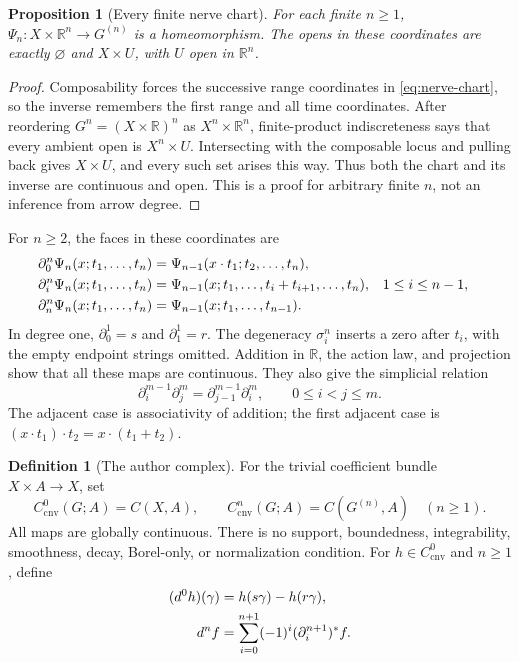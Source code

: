 \documentclass[11pt]{article}
\newtheorem{proposition}[theorem]{Proposition}
\theoremstyle{definition}
\newtheorem{definition}[theorem]{Definition}
\newcommand{\R}{\mathbb R}
\newcommand{\Ccnv}{C_{\mathrm{cnv}}}
\begin{document}
\begin{proposition}[Every finite nerve chart]
\label{prop:nerve}
For each finite $n\geq1$, $\Psi_n:X\times\R^n\to G^{(n)}$ is a
homeomorphism.  The opens in these coordinates are exactly $\varnothing$
and $X\times U$, with $U$ open in $\R^n$.
\end{proposition}

\begin{proof}
Composability forces the successive range coordinates in
\cref{eq:nerve-chart}, so the inverse remembers the first range and all time
coordinates.  After reordering $G^n=(X\times\R)^n$ as
$X^n\times\R^n$, finite-product indiscreteness says that every ambient open
is $X^n\times U$.  Intersecting with the composable locus and pulling back
gives $X\times U$, and every such set arises this way.  Thus both the chart
and its inverse are continuous and open.  This is a proof for arbitrary
finite $n$, not an inference from arrow degree.
\end{proof}

For $n\geq2$, the faces in these coordinates are
\begin{align}
\label{eq:faces}
 \partial_0^n\Psi_n(x;t_1,\ldots,t_n)
  &=\Psi_{n-1}(x\mathbin{\cdot}t_1;t_2,\ldots,t_n),\notag\\
 \partial_i^n\Psi_n(x;t_1,\ldots,t_n)
  &=\Psi_{n-1}(x;t_1,\ldots,t_i+t_{i+1},\ldots,t_n),
       &&1\leq i\leq n-1,\\
 \partial_n^n\Psi_n(x;t_1,\ldots,t_n)
  &=\Psi_{n-1}(x;t_1,\ldots,t_{n-1}).\notag
\end{align}
In degree one, $\partial_0^1=s$ and $\partial_1^1=r$.  The degeneracy
$\sigma_i^n$ inserts a zero after $t_i$, with the empty endpoint strings
omitted.  Addition in $\R$, the action law, and projection show that all
these maps are continuous.  They also give the simplicial relation
\begin{equation}
\label{eq:face-identity}
 \partial_i^{m-1}\partial_j^m
 =\partial_{j-1}^{m-1}\partial_i^m,\qquad 0\leq i<j\leq m.
\end{equation}
The adjacent case is associativity of addition; the first adjacent case is
$(x\mathbin{\cdot}t_1)\mathbin{\cdot}t_2
=x\mathbin{\cdot}(t_1+t_2)$.

\begin{definition}[The author complex]
\label{def:complex}
For the trivial coefficient bundle $X\times A\to X$, set
\begin{equation}
\label{eq:cochains}
 \Ccnv^0(G;A)=C(X,A),\qquad
 \Ccnv^n(G;A)=C(G^{(n)},A)\quad(n\geq1).
\end{equation}
All maps are globally continuous.  There is no support, boundedness,
integrability, smoothness, decay, Borel-only, or normalization condition.
For $h\in\Ccnv^0$ and $n\geq1$, define
\begin{align}
\label{eq:differential}
 (d^0h)(\gamma)&=h(s\gamma)-h(r\gamma),\notag\\
 d^nf&=\sum_{i=0}^{n+1}(-1)^i(\partial_i^{n+1})^*f.
\end{align}
\end{definition}
\end{document}
